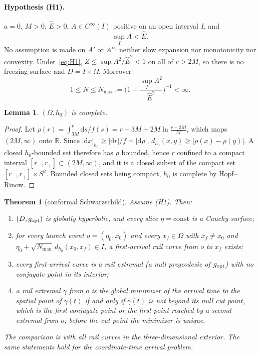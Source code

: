 \documentclass[aip,jmp,amsmath,amssymb,reprint]{revtex4-2}
\newcommand{\Ehat}{\hat E}
\newcommand{\dd}{\mathrm{d}}
\newcommand{\gopt}{g_{\rm opt}}
\theoremstyle{plain}
\newtheorem{theorem}{Theorem}
\newtheorem{lemma}[proposition]{Lemma}
\theoremstyle{definition}
\begin{document}
\paragraph{Hypothesis (H1).} $a=0$, $M>0$, $\Ehat>0$, $A\in C^\infty(I)$ positive on an
open interval $I$, and
\begin{equation}
  \sup_I A<\Ehat .
  \label{eq:H1}
\end{equation}
No assumption is made on $A'$ or $A''$: neither slow expansion nor monotonicity nor
convexity. Under~\eqref{eq:H1}, $Z\le\sup A^2/\Ehat^2<1$ on all of $r>2M$, so there is no
freezing surface and $D=I\times\Omega$. Moreover
\begin{equation}
  1\le N\le N_{\max}:=\Big(1-\frac{\sup_IA^2}{\Ehat^2}\Big)^{-1}<\infty .
  \label{eq:Nbounds}
\end{equation}

\begin{lemma}\label{lem:h0-complete}
$(\Omega,h_0)$ is complete.
\end{lemma}

\begin{proof}
Let $\rho(r)=\int_{3M}^r\dd s/f(s)=r-3M+2M\ln\frac{r-2M}{M}$, which maps $(2M,\infty)$
onto $\mathbb R$. Since $|\dd x|_{h_0}\ge|\dd r|/f=|\dd\rho|$,
$d_{h_0}(x,y)\ge|\rho(x)-\rho(y)|$. A closed $h_0$-bounded set therefore has $\rho$ bounded,
hence $r$ confined to a compact interval $[r_-,r_+]\subset(2M,\infty)$, and it is a
closed subset of the compact set $[r_-,r_+]\times S^2$. Bounded closed sets being
compact, $h_0$ is complete by Hopf--Rinow.
\end{proof}

\begin{theorem}[conformal Schwarzschild]\label{thm:schw}
Assume (H1). Then:
\begin{enumerate}
\item $(D,\gopt)$ is globally hyperbolic, and every slice $\eta=\mathrm{const}$ is a
  Cauchy surface;
\item for every launch event $o=(\eta_0,x_0)$ and every $x_f\in\Omega$ with $x_f\ne x_0$ and
  $\eta_0+\sqrt{N_{\max}}\,d_{h_0}(x_0,x_f)\in I$, a first-arrival rail curve from $o$ to
  $x_f$ exists;
\item every first-arrival curve is a rail extremal (a null pregeodesic of $\gopt$) with
  no conjugate point in its interior;
\item a rail extremal $\gamma$ from $o$ is the global minimizer of the arrival time to the
  spatial point of $\gamma(t)$ if and only if $\gamma(t)$ is not beyond its null cut point,
  which is the first conjugate point or the first point reached by a second extremal
  from $o$; before the cut point the minimizer is unique.
\end{enumerate}
The comparison is with all rail curves in the three-dimensional exterior. The same
statements hold for the coordinate-time arrival problem.
\end{theorem}
\end{document}
